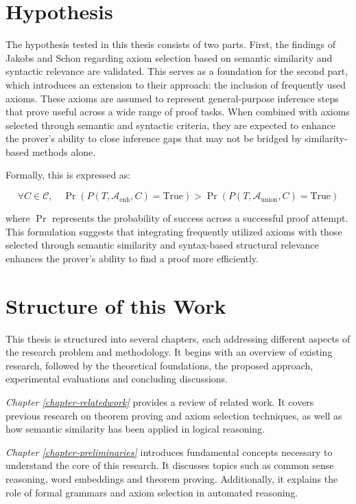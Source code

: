 \documentclass[english,version-2020-11]{uzl-thesis}
\begin{document}
\section{Hypothesis}

The hypothesis tested in this thesis consists of two parts. First, the findings of Jakobs and Schon regarding axiom selection based on semantic similarity and syntactic relevance are validated. This serves as a foundation for the second part, which introduces an extension to their approach: the inclusion of frequently used axioms. These axioms are assumed to represent general-purpose inference steps that prove useful across a wide range of proof tasks. When combined with axioms selected through semantic and syntactic criteria, they are expected to enhance the prover’s ability to close inference gaps that may not be bridged by similarity-based methods alone.

Formally, this is expressed as:

\begin{equation}
    \forall C \in \mathcal{C}, \quad \Pr(P(T, \mathcal{A}_{\text{enh}}, C) = \text{True}) > \Pr(P(T, \mathcal{A}_{\text{union}}, C) = \text{True})
\end{equation}

where \( \Pr \) represents the probability of success across a successful proof attempt. This formulation suggests that integrating frequently utilized axioms with those selected through semantic similarity and syntax-based structural relevance enhances the prover’s ability to find a proof more efficiently.


\section{Structure of this Work}

This thesis is structured into several chapters, each addressing different aspects of the research problem and methodology. It begins with an overview of existing research, followed by the theoretical foundations, the proposed approach, experimental evaluations and concluding discussions.

\textit{Chapter \ref{chapter-relatedwork}} provides a review of related work. It covers previous research on theorem proving and axiom selection techniques, as well as how semantic similarity has been applied in logical reasoning.

\textit{Chapter \ref{chapter-preliminaries}} introduces fundamental concepts necessary to understand the core of this research. It discusses topics such as common sense reasoning, word embeddings and theorem proving. Additionally, it explains the role of formal grammars and axiom selection in automated reasoning.
\end{document}
